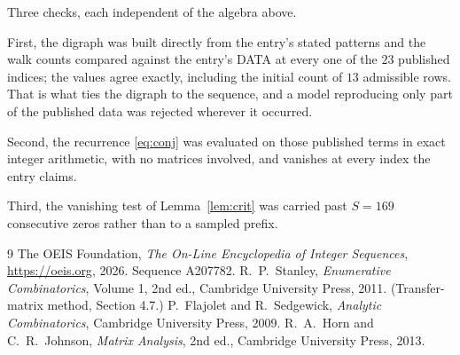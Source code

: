 \documentclass[11pt,a4paper]{article}
\theoremstyle{plain}
\theoremstyle{definition}
\begin{document}
Three checks, each independent of the algebra above.

First, the digraph was built directly from the entry's stated patterns and the walk counts
compared against the entry's DATA at every one of the $23$ published indices; the
values agree exactly, including the initial count of $13$ admissible rows. That is
what ties the digraph to the sequence, and a model reproducing only part of the published
data was rejected wherever it occurred.

Second, the recurrence \eqref{eq:conj} was evaluated on those published terms in exact
integer arithmetic, with no matrices involved, and vanishes at every index the entry claims.

Third, the vanishing test of Lemma~\ref{lem:crit} was carried past $S=169$ consecutive
zeros rather than to a sampled prefix.

\begin{thebibliography}{9}
 The OEIS Foundation, \emph{The On-Line Encyclopedia of Integer
Sequences}, \url{https://oeis.org}, 2026. Sequence A207782.
 R.~P.~Stanley, \emph{Enumerative Combinatorics}, Volume 1, 2nd ed.,
Cambridge University Press, 2011. (Transfer-matrix method, Section 4.7.)
 P.~Flajolet and R.~Sedgewick, \emph{Analytic Combinatorics}, Cambridge
University Press, 2009.
 R.~A.~Horn and C.~R.~Johnson, \emph{Matrix Analysis}, 2nd ed., Cambridge
University Press, 2013.
\end{thebibliography}
\end{document}
